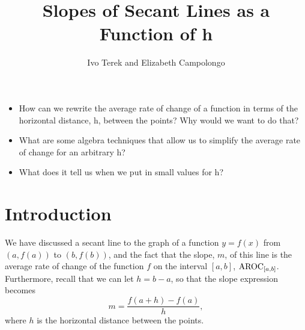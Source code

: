 \documentclass{ximera}
\author{Ivo Terek and Elizabeth Campolongo}
\title{Slopes of Secant Lines as a Function of h}
\begin{document}
\begin{abstract}
  
\end{abstract}
\maketitle



\begin{motivatingQuestions}\begin{itemize}
\item How can we rewrite the average rate of change of a function in terms of the horizontal distance, h, between the points?  Why would we want to do that?
\item What are some algebra techniques that allow us to simplify the average rate of change for an arbitrary h?
\item What does it tell us when we put in small values for h?
\end{itemize}\end{motivatingQuestions}



\section{Introduction}

We have discussed a secant line to the graph of a function $y=f(x)$ from $(a,f(a))$ to $(b,f(b))$, and the fact that the slope, $m$, of this line is the average rate of change of the function $f$ on the interval $[a,b]$, $\mathrm{AROC}_{[a,b]}$. Furthermore, recall that we can let $h=b-a$, so that the slope expression becomes 
%
$$m=\frac{f(a+h)-f(a)}{h},$$
where $h$ is the horizontal distance between the points.

\begin{image}[2in]
		\end{image}
\end{document}
